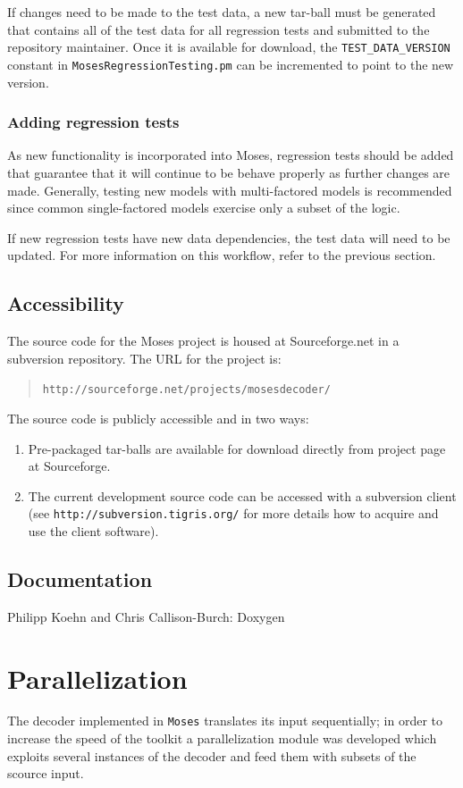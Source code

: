 \documentclass[10pt]{report}
\theoremstyle{plain}
\begin{document}
{If changes need to be made to the test data, a new tar-ball must be
generated that contains all of the test data for all regression
tests and submitted to the repository maintainer.  Once it is
available for download, the \texttt{TEST\_DATA\_VERSION} constant in
\texttt{MosesRegressionTesting.pm} can be incremented to point to
the new version.

\subsubsection{Adding regression tests}
As new functionality is incorporated into Moses, regression tests
should be added that guarantee that it will continue to be behave
properly as further changes are made.  Generally, testing new models
with multi-factored models is recommended since common
single-factored models exercise only a subset of the logic.

If new regression tests have new data dependencies, the test data
will need to be updated.  For more information on this workflow,
refer to the previous section.

\subsection{Accessibility}
The source code for the Moses project is housed at Sourceforge.net
in a subversion repository.  The URL for the project is:

\begin{quote}
    \texttt{http://sourceforge.net/projects/mosesdecoder/}
\end{quote}

The source code is publicly accessible and in two ways:
\begin{enumerate}
  \item Pre-packaged tar-balls are available for download directly
  from project page at Sourceforge.
  \item The current development source code can be accessed with a subversion client (see \texttt{http://subversion.tigris.org/}
for more details how to acquire and use the client software).
\end{enumerate}


\subsection{Documentation}
{\sc Philipp Koehn and Chris Callison-Burch: Doxygen}

\section{Parallelization}
The decoder implemented in {\tt Moses} translates its input sequentially; in order to increase 
the speed of the toolkit a parallelization module was developed which exploits several instances of the decoder and feed them with subsets of the scource input.


}
\end{document}
